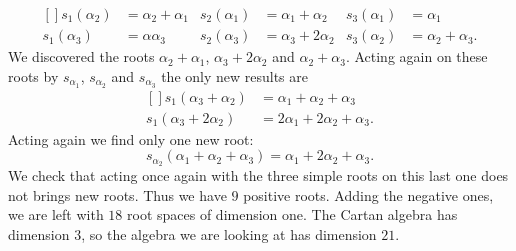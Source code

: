 \begin{equation}
	\begin{aligned}[]
		s_1(\alpha_2) & =\alpha_2+\alpha_1 & s_2(\alpha_1) & =\alpha_1+\alpha_2  & s_3(\alpha_1) & =\alpha_1           \\
		s_1(\alpha_3) & =\alpha\alpha_3    & s_2(\alpha_3) & =\alpha_3+2\alpha_2 & s_3(\alpha_2) & =\alpha_2+\alpha_3.
	\end{aligned}
\end{equation}
We discovered the roots \( \alpha_2+\alpha_1\), \( \alpha_3+2\alpha_2\) and \( \alpha_2+\alpha_3\). Acting again on these roots by \( s_{\alpha_1}\), \( s_{\alpha_2}\) and \( s_{\alpha_3}\) the only new results are
\begin{equation}
	\begin{aligned}[]
		s_1(\alpha_3+\alpha_2)  & =\alpha_1+\alpha_2+\alpha_3    \\
		s_1(\alpha_3+2\alpha_2) & =2\alpha_1+2\alpha_2+\alpha_3.
	\end{aligned}
\end{equation}
Acting again we find only one new root:
\begin{equation}
	s_{\alpha_2}(\alpha_1+\alpha_2+\alpha_3)=\alpha_1+2\alpha_2+\alpha_3.
\end{equation}
We check that acting once again with the three simple roots on this last one does not brings new roots. Thus we have \( 9\) positive roots. Adding the negative ones, we are left with \( 18\) root spaces of dimension one. The Cartan algebra has dimension \( 3\), so the algebra we are looking at has dimension \( 21\).

